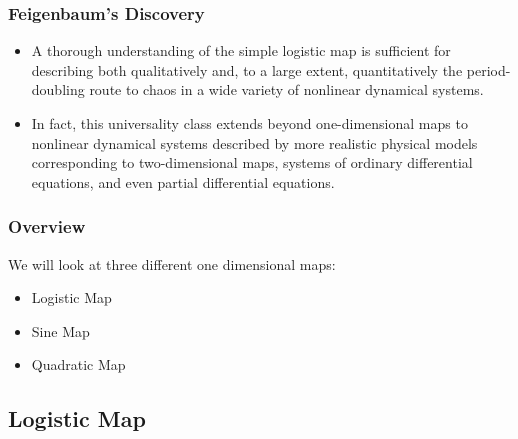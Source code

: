 \documentclass[
	11pt, %
	aspectratio=169, %
]{beamer}
\begin{document}

\begin{frame}
	\frametitle{Feigenbaum's Discovery}
	
	\begin{itemize}
        \item A thorough understanding of the simple logistic map is sufficient for describing both qualitatively and, to a large extent, quantitatively the period-doubling route to chaos in a wide variety of nonlinear dynamical systems. \pause
        \item In fact, this universality class extends beyond one-dimensional maps to nonlinear dynamical systems described by more realistic physical models corresponding to two-dimensional maps, systems of ordinary differential equations, and even partial differential equations.
    \end{itemize}

\end{frame}


\begin{frame}
	\frametitle{Overview}

    We will look at three different one dimensional maps: \pause

    \begin{itemize}
        \item Logistic Map \pause
        \item Sine Map \pause
        \item Quadratic Map
    \end{itemize}

\end{frame}


\subsection{Logistic Map}
\end{document}
